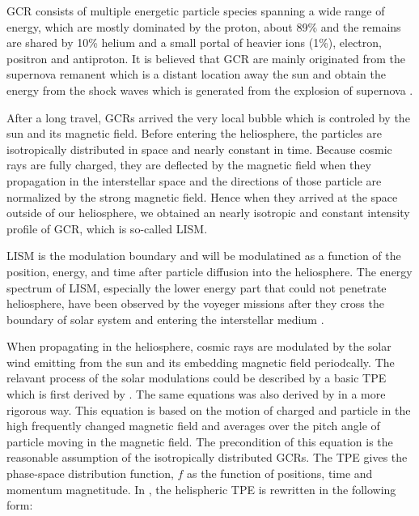 \ac{GCR} consists of multiple energetic particle species spanning a wide range of energy, which are mostly dominated by the proton, about 89\%  and the remains are shared by 10\% helium and a small portal of heavier ions (1\%), electron, positron and antiproton. 
It is believed that \ac{GCR} are mainly originated from the supernova remanent which is a distant location away the sun \citep{Blasi2013AARv2013,Bhattacarjee2000PhR,Fermi1949PhRv} and obtain the energy from the shock waves which is generated from the explosion of supernova \citep{blandford1978particle}.

After a long travel, \acp{GCR} arrived the very local bubble which is controled by the sun and its magnetic field.
Before entering the heliosphere, the particles are isotropically distributed in space and nearly constant in time. Because cosmic rays are fully charged, they are deflected by the magnetic field when they propagation in the interstellar space and the directions of those particle are normalized by the strong magnetic field. Hence when they arrived at the space outside of our heliosphere, we obtained an nearly isotropic and constant intensity profile of \ac{GCR}, which is so-called \ac{LISM}.

\ac{LISM} is the modulation boundary and will be modulatined as a function of the position, energy, and time after particle diffusion into the heliosphere. The energy spectrum of \ac{LISM}, especially the lower energy part that could not penetrate heliosphere, have been observed by the voyeger missions after they cross the boundary of solar system and entering the interstellar medium \citep{Stone2013Sci, Cummings2016ApJ,Stone2019NatAs}.


When propagating in the heliosphere, cosmic rays are modulated by the solar wind emitting from the sun and its embedding magnetic field periodcally. The relavant process of the solar modulations could be described by a basic \ac{TPE} which is first derived by \citet{Parker1965Pss}. The same equations was also derived by \citet{Gleeson1967ApJ} in a more rigorous way. This equation is based on the motion of charged and particle in the high frequently changed magnetic field and averages over the pitch angle of particle moving in the magnetic field. The precondition of this equation is the reasonable assumption of the isotropically distributed GCRs. The \ac{TPE} gives the phase-space distribution function, $f$ as the function of positions, time and momentum magnetitude. In \citet{Potgieter2013LRSP}, the helispheric \ac{TPE} is rewritten in the following form:

